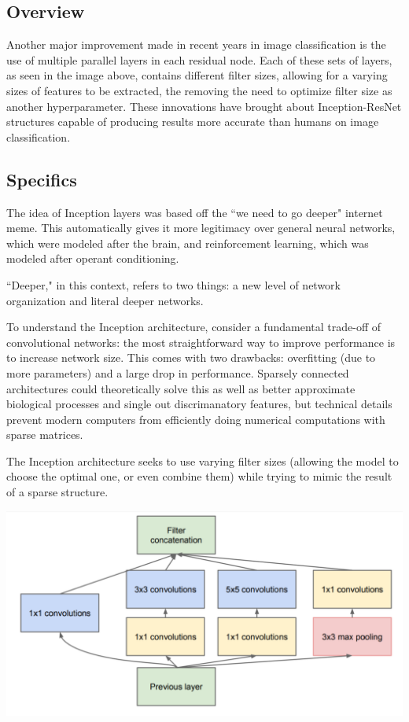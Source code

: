 \documentclass{article}
\begin{document}
\subsection{Overview}
Another major improvement made in recent years in image classification is the use of multiple parallel layers in each residual node. Each of these sets of layers, as seen in the image above, contains different filter sizes, allowing for a varying sizes of features to be extracted, the removing the need to optimize filter size as another hyperparameter. These innovations have brought about Inception-ResNet structures capable of producing results more accurate than humans on image classification.

\subsection{Specifics}
    The idea of Inception layers was based off the ``we need to go deeper" internet meme. This automatically gives it more legitimacy over general neural networks, which were modeled after the brain, and reinforcement learning, which was modeled after operant conditioning.
    
    ``Deeper," in this context, refers to two things: a new level of network organization and literal deeper networks. 
    
    To understand the Inception architecture, consider a fundamental trade-off of convolutional networks: the most straightforward way to improve performance is to increase network size. This comes with two drawbacks: overfitting (due to more parameters) and a large drop in performance. Sparsely connected architectures could theoretically solve this as well as better approximate biological processes and single out discrimanatory features, but technical details prevent modern computers from efficiently doing numerical computations with sparse matrices.
    
    The Inception architecture seeks to use varying filter sizes (allowing the model to choose the optimal one, or even combine them) while trying to mimic the result of a sparse structure. 
    
    \begin{center}
    \includegraphics[scale=0.5]{inception2}
    \end{center}
    
\end{document}
